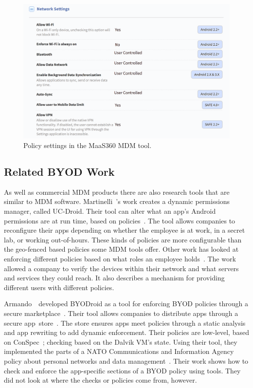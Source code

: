 \documentclass[thesis.tex]{subfiles}
\begin{document}
\begin{figure}
  \centering
  \includegraphics[width=\textwidth]{figures/maas360-policy.png}
  \caption{Policy settings in the MaaS360 MDM tool.}
  \label{fig:maas360-policy}
\end{figure}

\subsection{Related BYOD Work}

As well as commercial \ac{MDM} products there are also research tools
that are similar to \ac{MDM} software. Martinelli~\etal{}'s work
creates a dynamic permissions manager, called UC-Droid. Their tool can
alter what an app's Android permissions are at run time, based on
policies~\cite{martinelli_enhancing_2016}.  The tool allows companies
to reconfigure their apps depending on whether the employee is at
work, in a secret lab, or working out-of-hours. These kinds of
policies are more configurable than the geo-fenced based policies some
\ac{MDM} tools offer. Other work has looked at enforcing different
policies based on what roles an employee
holds~\cite{costantino_towards_2013}. The work allowed a company to
verify the devices within their network and what servers and services
they could reach. It also describes a mechanism for providing
different users with different policies.

Armando~\etal~developed BYODroid as a tool for enforcing BYOD policies through a
secure marketplace~\cite{armando_bring_2013}. Their tool allows companies to
distribute apps through a secure app~store~\cite{armando_enabling_2014}. The
store ensures apps meet policies through a static analysis and
app rewriting to add dynamic enforcement. Their policies are low-level, based on
ConSpec~\cite{aktug_conspec_2008}; checking based on the Dalvik VM's state.
Using their tool, they implemented the parts of a NATO Communications and
Information Agency policy about personal networks and data
management~\cite{armando_developing_2016}. Their work shows how to check and enforce the app-specific
sections of a BYOD policy using tools. They did not
look at where the checks or policies come from, however.
\end{document}
